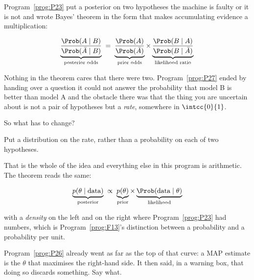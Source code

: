 \begin{fr}
Program~\ref{prog:P23} put a posterior on two hypotheses \dash{} the machine
is faulty or it is not \dash{} and wrote Bayes' theorem in the form that makes
accumulating evidence a multiplication:

\[ \underbrace{\frac{\Prob(A \mid B)}{\Prob(\bar{A} \mid B)}}_{\text{posterior odds}}
   \;=\;
   \underbrace{\frac{\Prob(A)}{\Prob(\bar{A})}}_{\text{prior odds}}
   \times
   \underbrace{\frac{\Prob(B \mid A)}{\Prob(B \mid \bar{A})}}_{\text{likelihood ratio}} \]

Nothing in the theorem cares that there were two. Program~\ref{prog:P27}
ended by handing over a question it could not answer \dash{} the probability
that model B is better than model A \dash{} and the obstacle there was that
the thing you are uncertain about is not a pair of hypotheses but a
\emph{rate}, somewhere in $\intcc{0}{1}$.

So what has to change?
\dotline
\nextframe
\end{fr}

\begin{fr}
\begin{ansblock}
Put a distribution on the rate, rather than a probability on each of two
hypotheses.
\end{ansblock}

That is the whole of the idea and everything else in this program is
arithmetic. The theorem reads the same:

\[ \underbrace{p(\theta \mid \text{data})}_{\text{posterior}}
   \;\propto\;
   \underbrace{p(\theta)}_{\text{prior}}
   \times
   \underbrace{\Prob(\text{data} \mid \theta)}_{\text{likelihood}} \]

with a \emph{density} on the left and on the right where
Program~\ref{prog:P23} had numbers, which is Program~\ref{prog:F13}'s
distinction between a probability and a probability per unit.

Program~\ref{prog:P26} already went as far as the top of that curve: a MAP
estimate is the $\theta$ that maximises the right-hand side. It then said,
in a warning box, that doing so discards something. Say what.
\dotline
\nextframe
\end{fr}

